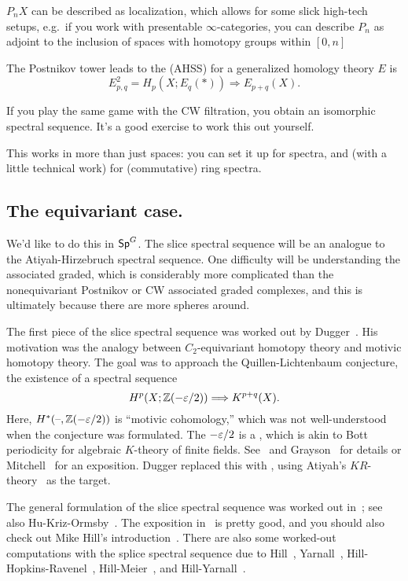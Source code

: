 $P_nX$ can be described as localization, which allows for some slick high-tech setups, e.g.\ if you work with
presentable $\infty$-categories, you can describe $P_n$ as adjoint to the inclusion of spaces with homotopy groups
within $[0,n]$

The Postnikov tower leads to the  (AHSS) for a generalized homology
theory $E$ is
\[E_{p,q}^2 = H_p(X; E_q(*))\Longrightarrow E_{p+q}(X).\]
\begin{ex}
If you play the same game with the CW filtration, you obtain an isomorphic spectral sequence. It's a good exercise
to work this out yourself.
\end{ex}
This works in more than just spaces: you can set it up for spectra, and (with a little technical work) for
(commutative) ring spectra.
\subsection*{The equivariant case.}
We'd like to do this in $\mathsf{Sp}^G$. The slice spectral sequence will be an analogue to the Atiyah-Hirzebruch spectral
sequence. One difficulty will be understanding the associated graded, which is considerably more complicated than
the nonequivariant Postnikov or CW associated graded complexes, and this is ultimately because there are more
spheres around.

The first piece of the slice spectral sequence was worked out by Dugger~\cite{DuggerKR}. His motivation was the
analogy between $C_2$-equivariant homotopy theory and motivic homotopy theory.   The goal was to approach the Quillen-Lichtenbaum conjecture, the existence of a spectral sequence
\[H^p(X; \mathbb Z(-\varepsilon/2))\Longrightarrow K^{p+q}(X).\]
Here, $H^*(\text{--},\mathbb Z(-\varepsilon/2))$ is ``motivic cohomology,'' which was not well-understood when the conjecture was
formulated. The $-\varepsilon/2$ is a , which is akin to Bott periodicity for algebraic $K$-theory of
finite fields. See~ and Grayson~\cite{Grayson} for details or Mitchell~\cite{Mitchell}
for an exposition. Dugger replaced this with \TODO, using Atiyah's $\mathit{KR}$-theory~\cite{AtiyahKR} as the
target.

The general formulation of the slice spectral sequence was worked out in~\cite{HHR}; see also
Hu-Kriz-Ormsby~\cite{HKO11}. The exposition in~\cite{HHR} is pretty good, and you should also check out Mike Hill's
introduction~\cite{HillSlice}.  There are also some worked-out computations with the splice spectral sequence due
to Hill~\cite{HillRealBordism}, Yarnall~\cite{Yarnall}, Hill-Hopkins-Ravenel~\cite{HHR_HZ, HHR_C4},
Hill-Meier~\cite{HillMeier}, and Hill-Yarnall~\cite{HillYarnall}.

